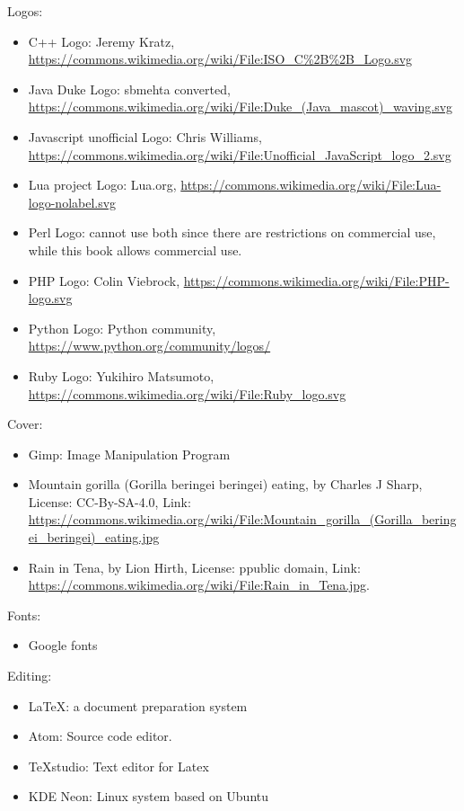 \documentclass[12pt]{book}
\begin{document}
Logos: 
\begin{itemize}
	\item C++ Logo: Jeremy Kratz, \url{https://commons.wikimedia.org/wiki/File:ISO_C\%2B\%2B_Logo.svg}
	\item Java Duke Logo: sbmehta converted, \url{https://commons.wikimedia.org/wiki/File:Duke_(Java_mascot)_waving.svg}
	\item Javascript unofficial Logo: Chris Williams,  \url{https://commons.wikimedia.org/wiki/File:Unofficial_JavaScript_logo_2.svg}
	\item Lua project Logo: Lua.org, \url{https://commons.wikimedia.org/wiki/File:Lua-logo-nolabel.svg}
	\item Perl Logo: cannot use both since there are restrictions on commercial use, while this book allows commercial use.
	\item PHP Logo: Colin Viebrock, \url{https://commons.wikimedia.org/wiki/File:PHP-logo.svg}
	\item Python Logo: Python community, \url{https://www.python.org/community/logos/}
	\item Ruby Logo: Yukihiro Matsumoto, \url{https://commons.wikimedia.org/wiki/File:Ruby_logo.svg}
\end{itemize}

Cover:
\begin{itemize}
	\item Gimp: Image Manipulation Program
	\item Mountain gorilla (Gorilla beringei beringei) eating, by Charles J Sharp, License: CC-By-SA-4.0, Link: \url{https://commons.wikimedia.org/wiki/File:Mountain_gorilla_(Gorilla_beringei_beringei)_eating.jpg}
	\item Rain in Tena, by Lion Hirth, License: ppublic domain, Link: \url{https://commons.wikimedia.org/wiki/File:Rain_in_Tena.jpg}.
\end{itemize}

Fonts: 
\begin{itemize}
	\item Google fonts 
\end{itemize}

Editing:
\begin{itemize}
	\item \LaTeX: a document preparation system
	\item Atom: Source code editor.
	\item TeXstudio: Text editor for Latex
	\item KDE Neon: Linux system based on Ubuntu
\end{itemize}
\end{document}
